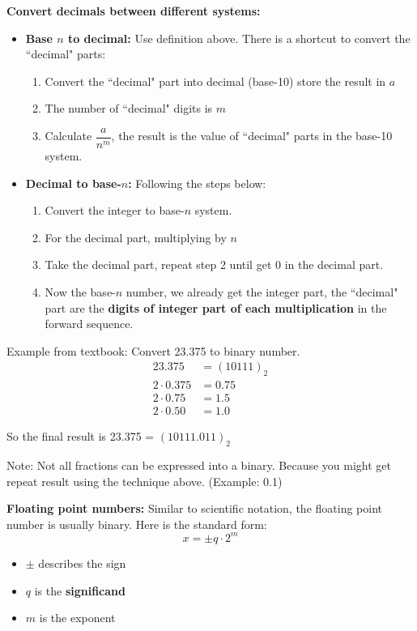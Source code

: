 \documentclass[12pt]{article}
\begin{document}
\medskip
\noindent \textbf{Convert decimals between different systems:}
    \begin{itemize}
        \item \textbf{Base $n$ to decimal:} Use definition above. There is a shortcut to convert the ``decimal" parts:
            \begin{enumerate}
                \item Convert the ``decimal" part into decimal (base-10) store the result in $a$
                \item The number of ``decimal" digits is $m$
                \item Calculate $\dfrac{a}{n^m}$, the result is the value of ``decimal" parts in the base-10 system.
            \end{enumerate}
        \item \textbf{Decimal to base-$n$:} Following the steps below:
            \begin{enumerate}
                \item Convert the integer to base-$n$ system.
                \item For the decimal part, multiplying by $n$
                \item Take the decimal part, repeat step 2 until get 0 in the decimal part.
                \item Now the base-$n$ number, we already get the integer part, the ``decimal" part are the \textbf{digits of integer part of each multiplication} in the forward sequence.
            \end{enumerate}
    \end{itemize}
    Example from textbook: Convert 23.375 to binary number.
    \begin{align*}
        23.375 &= (10111)_2 \\
        2 \cdot 0.375 &= 0.75 \\
        2 \cdot 0.75 &= 1.5 \\
        2 \cdot 0.50 &= 1.0
    \end{align*}
    
        So the final result is 23.375 = $(10111.011)_2$

        Note: Not all fractions can be expressed into a binary. Because you might get repeat result using the technique above. (Example: 0.1)

\newpage
\noindent \textbf{Floating point numbers:} Similar to scientific notation, the floating point number is usually binary. Here is the standard form:
    $$x = \pm q \cdot 2^m$$
    \begin{itemize}
        \item $\pm$ describes the sign
        \item $q$ is the \textbf{significand}
        \item $m$ is the exponent
    \end{itemize}
\end{document}
